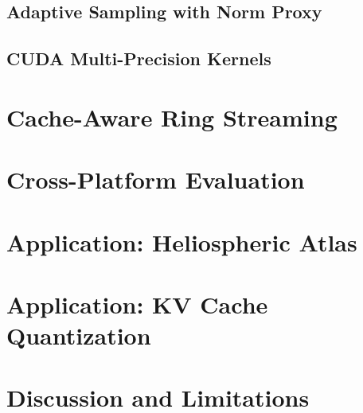 \documentclass[sigconf,10pt,anonymous]{acmart}
\begin{document}
\subsection{Adaptive Sampling with Norm Proxy}

\subsection{CUDA Multi-Precision Kernels}

\section{Cache-Aware Ring Streaming}
\label{sec:ring}


\section{Cross-Platform Evaluation}
\label{sec:eval}


\section{Application: Heliospheric Atlas}
\label{sec:atlas}


\section{Application: KV Cache Quantization}
\label{sec:turboquant}


\section{Discussion and Limitations}
\label{sec:discussion}
\end{document}
